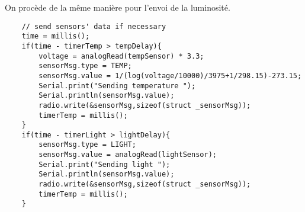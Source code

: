 On procède de la même manière pour l'envoi de la luminosité.

\bigbreak
\begin{DDbox}{\linewidth}
\begin{lstlisting}
	// send sensors' data if necessary
	time = millis();
	if(time - timerTemp > tempDelay){
		voltage = analogRead(tempSensor) * 3.3;
		sensorMsg.type = TEMP;
		sensorMsg.value = 1/(log(voltage/10000)/3975+1/298.15)-273.15;
		Serial.print("Sending temperature ");
		Serial.println(sensorMsg.value);
		radio.write(&sensorMsg,sizeof(struct _sensorMsg));
		timerTemp = millis();
	}
	if(time - timerLight > lightDelay){
		sensorMsg.type = LIGHT;
		sensorMsg.value = analogRead(lightSensor);
		Serial.print("Sending light ");
		Serial.println(sensorMsg.value);
		radio.write(&sensorMsg,sizeof(struct _sensorMsg));
		timerTemp = millis();
	}
\end{lstlisting}
\end{DDbox}

